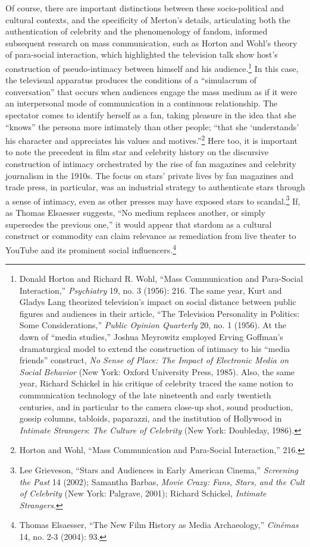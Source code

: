 \documentclass{tufte-handout}
\begin{document}
Of course, there are important distinctions between these
socio-political and cultural contexts, and the specificity of Merton's
details, articulating both the authentication of celebrity and the
phenomenology of fandom, informed subsequent research on mass
communication, such as Horton and Wohl's theory of para-social
interaction, which highlighted the television talk show host's
construction of pseudo-intimacy between himself and his
audience.\footnote{Donald Horton and Richard R. Wohl, ``Mass
  Communication and Para-Social Interaction,'' \emph{Psychiatry} 19, no.
  3 (1956): 216. The same year, Kurt and Gladys Lang theorized
  television's impact on social distance between public figures and
  audiences in their article, ``The Television Personality in Politics:
  Some Considerations,'' \emph{Public Opinion Quarterly} 20, no. 1
  (1956). At the dawn of ``media studies,'' Joshua Meyrowitz employed
  Erving Goffman's dramaturgical model to extend the construction of
  intimacy to his ``media friends'' construct, \emph{No Sense of Place:
  The Impact of Electronic Media on Social Behavior} (New York: Oxford
  University Press, 1985). Also, the same year, Richard Schickel in his
  critique of celebrity traced the same notion to communication
  technology of the late nineteenth and early twentieth centuries, and
  in particular to the camera close-up shot, sound production, gossip
  columns, tabloids, paparazzi, and the institution of Hollywood in
  \emph{Intimate Strangers}: \emph{The Culture of Celebrity} (New York:
  Doubleday, 1986).} In this case, the televisual apparatus produces the
conditions of a ``simulacrum of conversation'' that occurs when
audiences engage the mass medium as if it were an interpersonal mode of
communication in a continuous relationship. The spectator comes to
identify herself as a fan, taking pleasure in the idea that she
``knows'' the persona more intimately than other people; ``that she
`understands' his character and appreciates his values and
motives.''\footnote{Horton and Wohl, ``Mass Communication and
  Para-Social Interaction,'' 216.} Here too, it is important to note the
precedent in film star and celebrity history on the discursive
construction of intimacy orchestrated by the rise of fan magazines and
celebrity journalism in the 1910s. The focus on stars' private lives by
fan magazines and trade press, in particular, was an industrial strategy
to authenticate stars through a sense of intimacy, even as other presses
may have exposed stars to scandal.\footnote{Lee Grieveson, ``Stars and
  Audiences in Early American Cinema,'' \emph{Screening the Past} 14
  (2002); Samantha Barbas, \emph{Movie Crazy: Fans, Stars, and the Cult
  of Celebrity} (New York: Palgrave, 2001); Richard Schickel,
  \emph{Intimate Strangers}.} If, as Thomas Elsaesser suggests, ``No
medium replaces another, or simply supersedes the previous one,'' it
would appear that stardom as a cultural construct or commodity can claim
relevance as remediation from live theater to YouTube and its prominent
social influencers.\footnote{Thomas Elsaesser, ``The New Film History as
  Media Archaeology,'' \emph{Cinémas} 14, no. 2-3 (2004): 93.}
\end{document}
